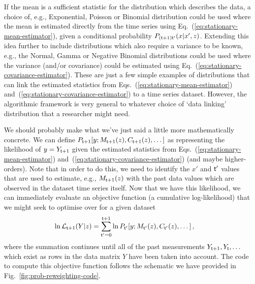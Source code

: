 If the mean is a sufficient statistic for the distribution which describes the data, a choice of, e.g., Exponential, Poisson or Binomial distribution could be used where the mean is estimated directly from the time series using Eq.~(\ref{eq:stationary-mean-estimator}), given a conditional probability $P_{({\sf t}+1){\sf t}'}(x\vert x',z)$. Extending this idea further to include distributions which also require a variance to be known, e.g., the Normal, Gamma or Negative Binomial distributions could be used where the variance (and/or covariance) could be estimated using Eq.~(\ref{eq:stationary-covariance-estimator}). These are just a few simple examples of distributions that can link the estimated statistics from Eqs.~(\ref{eq:stationary-mean-estimator}) and~(\ref{eq:stationary-covariance-estimator}) to a time series dataset. However, the algorithmic framework is very general to whatever choice of `data linking' distribution that a researcher might need.

We should probably make what we've just said a little more mathematically concrete. We can define $P_{{\sf t}+1}[y;M_{{\sf t}+1}(z),C_{{\sf t}+1}(z),\dots ]$ as representing the likelihood of $y = Y_{{\sf t}+1}$ given the estimated statistics from Eqs.~(\ref{eq:stationary-mean-estimator}) and~(\ref{eq:stationary-covariance-estimator}) (and maybe higher-orders). Note that in order to do this, we need to identify the $x'$ and ${\sf t}'$ values that are used to estimate, e.g., $M_{{\sf t}+1}(z)$ with the past data values which are observed in the dataset time series itself. Now that we have this likelihood, we can immediately evaluate an objective function (a cumulative log-likelihood) that we might seek to optimise over for a given dataset 
\begin{align}
\ln {\cal L}_{{\sf t}+1}(Y\vert z) &= \sum_{{\sf t}'=0}^{{\sf t}+1} \ln P_{{\sf t}'}[y;M_{{\sf t}'}(z),C_{{\sf t}'}(z),\dots ] \,, \label{eq:log-likelihood-reweighting}
\end{align}
where the summation continues until all of the past measurements $Y_{{\sf t}+1}, Y_{{\sf t}}, \dots$ which exist as rows in the data matrix $Y$ have been taken into account. The code to compute this objective function follows the schematic we have provided in Fig.~\ref{fig:prob-reweighting-code}.

